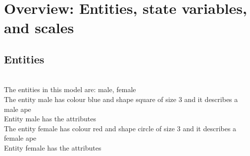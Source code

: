 \documentclass{article}
\begin{document}
\section{Overview: Entities, state variables, and scales}
\hline                  
\parbox{\linewidth}{
\subsection{Entities}\\  
The entities in this model are: {\color{blue}male}, {\color{blue}female} \\ 
The entity {\color{blue}male} has colour blue and shape square of size 3 and it describes a male ape \\
Entity {\color{blue}male} has the attributes \\

\hline               
The entity {\color{blue}female} has colour red and shape circle of size 3 and it describes a female ape\\
Entity {\color{blue}female} has the attributes\\
\hline
}

\end{document}
